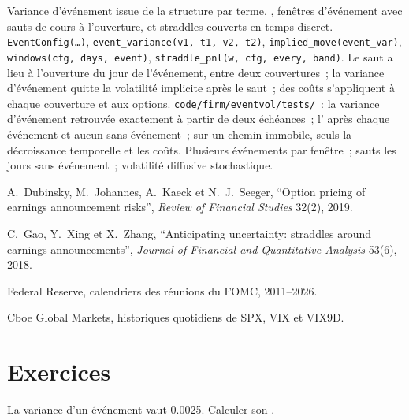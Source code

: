 \begin{build}
 Variance d'événement issue de la structure par terme, , fenêtres d'événement avec sauts de cours à l'ouverture, et straddles couverts en temps discret.
 \texttt{EventConfig(\dots)}, \texttt{event\_variance(v1, t1, v2, t2)}, \texttt{implied\_move(event\_var)},
\texttt{windows(cfg, days, event)}, \texttt{straddle\_pnl(w, cfg, every, band)}.
 Le saut a lieu à l'ouverture du jour de l'événement, entre deux couvertures~; la variance d'événement quitte la volatilité implicite après le saut~; des coûts s'appliquent à chaque
couverture et aux options.
 \texttt{code/firm/eventvol/tests/}~: la variance d'événement retrouvée exactement à partir de deux échéances~; l' après chaque événement et
aucun sans événement~; sur un chemin immobile, seuls la décroissance temporelle et les coûts.
 Plusieurs événements par fenêtre~; sauts les jours sans événement~; volatilité diffusive stochastique.
\end{build}

\begin{omsources}
\item A.~Dubinsky, M.~Johannes, A.~Kaeck et N.~J.~Seeger, ``Option pricing of earnings announcement risks'', \emph{Review of Financial Studies}
32(2), 2019.
\item C.~Gao, Y.~Xing et X.~Zhang, ``Anticipating uncertainty: straddles around earnings announcements'', \emph{Journal of Financial and Quantitative
Analysis} 53(6), 2018.
\item Federal Reserve, calendriers des réunions du FOMC, 2011--2026.
\item Cboe Global Markets, historiques quotidiens de SPX, VIX et VIX9D.
\end{omsources}

\section{Exercices}

\begin{exercise}[$\star$]\label{exo:s2:gamma-scalping-and-event-volatility:1}
La variance d'un événement vaut 0.0025. Calculer son .
\end{exercise}

